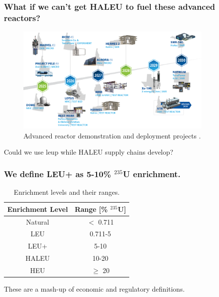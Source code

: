 \documentclass[9pt]{beamer}
\begin{document}
  \begin{frame}
    \frametitle{What if we can't get HALEU to fuel these advanced reactors?}
    \begin{figure}
        \centering
        \includegraphics[width=0.86\textwidth]{images/reactor_timeline.png}
        \caption{Advanced reactor demonstration and deployment projects \cite{inl_reactor_timeline}.}
    \end{figure}
    Could we use \gls{leup} while HALEU supply chains develop?
  \end{frame}

  \begin{frame}
    \frametitle{We define LEU+ as 5-10\% $^{235}$U enrichment.}
    \begin{table}[H]
        \centering
        \caption{Enrichment levels and their ranges.}
        \label{tab:enrichment_levels}
        \begin{tabular}{c c}
          \hline
          \textbf{Enrichment Level} & \textbf{Range [\%  $^{235}$U]} \\
          \hline
          Natural & $<$ 0.711 \\
          LEU & 0.711-5 \\
          LEU+ & 5-10 \\
          HALEU & 10-20 \\
          HEU & $\geq$ 20  \\
          \hline
        \end{tabular}
    \end{table}
    These are a mash-up of economic and regulatory definitions.
  \end{frame}
\end{document}
